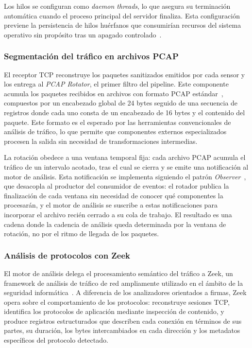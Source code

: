 Los hilos se configuran como \textit{daemon threads}, lo que 
asegura su terminación automática cuando el proceso principal del 
servidor finaliza. Esta configuración previene la persistencia de 
hilos huérfanos que consumirían recursos del sistema operativo sin 
propósito tras un apagado controlado~\cite{silberschatz2018os}.

\subsubsection{Segmentación del tráfico en archivos PCAP}

El receptor TCP reconstruye los paquetes sanitizados emitidos por 
cada sensor y los entrega al \textit{PCAP Rotator}, el primer 
filtro del pipeline. Este componente acumula los paquetes recibidos 
en archivos con formato PCAP estándar~\cite{harris2020libpcap}, 
compuestos por un encabezado global de 24 bytes seguido de una 
secuencia de registros donde cada uno consta de un encabezado de 16 
bytes y el contenido del paquete. Este formato es el esperado por 
las herramientas convencionales de análisis de tráfico, lo que 
permite que componentes externos especializados procesen la salida 
sin necesidad de transformaciones intermedias.

La rotación obedece a una ventana temporal fija: cada archivo PCAP 
acumula el tráfico de un intervalo acotado, tras el cual se cierra 
y se emite una notificación al motor de análisis. Esta 
notificación se implementa siguiendo el patrón \textit{Observer}~\cite{gof1994}, 
que desacopla al productor del consumidor de 
eventos: el rotador publica la finalización de cada ventana sin 
necesidad de conocer qué componentes la procesarán, y el motor de 
análisis se suscribe a estas notificaciones para incorporar el 
archivo recién cerrado a su cola de trabajo. El resultado es una 
cadena donde la cadencia de análisis queda determinada por la 
ventana de rotación, no por el ritmo de llegada de los paquetes.

\subsubsection{Análisis de protocolos con Zeek}

El motor de análisis delega el procesamiento semántico del tráfico 
a Zeek, un framework de análisis de tráfico de red ampliamente 
utilizado en el ámbito de la seguridad informática~\cite{paxson1999zeek}. 
A diferencia de los analizadores orientados 
a firmas, Zeek opera sobre el comportamiento de los protocolos: 
reconstruye sesiones TCP, identifica los protocolos de aplicación 
mediante inspección de contenido, y produce registros estructurados 
que describen cada conexión en términos de sus partes, su duración, 
los bytes intercambiados en cada dirección y los metadatos 
específicos del protocolo detectado.

